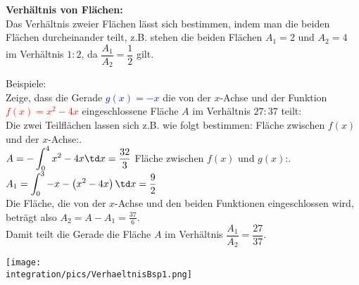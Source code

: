 \begin{tcolorbox}
	\textbf{Verhältnis von Flächen:}\\
	\textcolor{loestc}{Das Verhältnis zweier Flächen lässt sich bestimmen, indem man die beiden Flächen durcheinander teilt, z.B. stehen die beiden Flächen \(A_1=2\) und \(A_2=4\) im Verhältnis \(1:2\), da \(\dfrac{A_1}{A_2}=\dfrac{1}{2}\) gilt.
	}
\end{tcolorbox}
\begin{minipage}{\textwidth}
	\begin{minipage}{.6\textwidth}\raggedright
		Beispiele:\\
		Zeige, dass die Gerade \textcolor{blue}{\(g(x)=-x\)} die von der \(x\)-Achse und der Funktion \textcolor{red}{\(f(x)=x^2-4x\)} eingeschlossene Fläche \(A\) im Verhältnis \(27:37\) teilt:\\
		\textcolor{loes}{Die zwei Teilflächen lassen sich z.B. wie folgt bestimmen:}
		\textcolor{loes}{Fläche zwischen \(f(x)\) und der \(x\)-Achse:}.\\
		\textcolor{loes}{\(\displaystyle A=-\int_0^4 x^2-4x \td x=\frac{32}{3}\)}
		\textcolor{loes}{Fläche zwischen \(f(x)\) und \(g(x)\):}.\\
		\textcolor{loes}{\(\displaystyle A_1=\int_0^3 -x-\left(x^2-4x\right) \td x=\frac{9}{2}\)}\\		
		\textcolor{loes}{Die Fläche, die von der \(x\)-Achse und den beiden Funktionen eingeschlossen wird, beträgt also \(A_2=A-A_1=\tfrac{37}{6}\)}.\\
		\textcolor{loes}{Damit teilt die Gerade die Fläche \(A\) im Verhältnis \(\dfrac{A_1}{A_2}=\dfrac{27}{37}\)}.\\
	\end{minipage}
	\begin{minipage}{.4\textwidth}
		\texttt{[image: \\integration/pics/VerhaeltnisBsp1.png]}
	\end{minipage}
\end{minipage}\vspace{\baselineskip}\\
